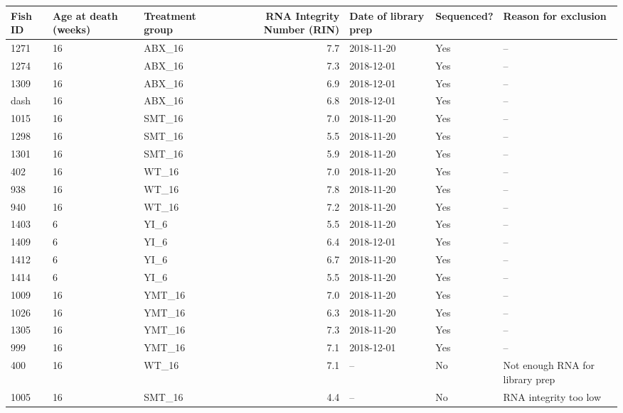 \begin{tabular}{lllrlll}
  \toprule Fish ID & Age at death (weeks) & Treatment group & RNA Integrity Number (RIN) & Date of library prep & Sequenced? & Reason for exclusion \\ 
  \midrule 1271 & 16 & ABX\_16 & 7.7 & 2018-11-20 & Yes & -- \\ 
  1274 & 16 & ABX\_16 & 7.3 & 2018-12-01 & Yes & -- \\ 
  1309 & 16 & ABX\_16 & 6.9 & 2018-12-01 & Yes & -- \\ 
  dash & 16 & ABX\_16 & 6.8 & 2018-12-01 & Yes & -- \\ 
  1015 & 16 & SMT\_16 & 7.0 & 2018-11-20 & Yes & -- \\ 
  1298 & 16 & SMT\_16 & 5.5 & 2018-11-20 & Yes & -- \\ 
  1301 & 16 & SMT\_16 & 5.9 & 2018-11-20 & Yes & -- \\ 
  402 & 16 & WT\_16 & 7.0 & 2018-11-20 & Yes & -- \\ 
  938 & 16 & WT\_16 & 7.8 & 2018-11-20 & Yes & -- \\ 
  940 & 16 & WT\_16 & 7.2 & 2018-11-20 & Yes & -- \\ 
  1403 &  6 & YI\_6 & 5.5 & 2018-11-20 & Yes & -- \\ 
  1409 &  6 & YI\_6 & 6.4 & 2018-12-01 & Yes & -- \\ 
  1412 &  6 & YI\_6 & 6.7 & 2018-11-20 & Yes & -- \\ 
  1414 &  6 & YI\_6 & 5.5 & 2018-11-20 & Yes & -- \\ 
  1009 & 16 & YMT\_16 & 7.0 & 2018-11-20 & Yes & -- \\ 
  1026 & 16 & YMT\_16 & 6.3 & 2018-11-20 & Yes & -- \\ 
  1305 & 16 & YMT\_16 & 7.3 & 2018-11-20 & Yes & -- \\ 
  999 & 16 & YMT\_16 & 7.1 & 2018-12-01 & Yes & -- \\ 
  400 & 16 & WT\_16 & 7.1 & -- & No & Not enough RNA for library prep \\ 
  1005 & 16 & SMT\_16 & 4.4 & -- & No & RNA integrity too low \\ 
   \bottomrule \end{tabular}
